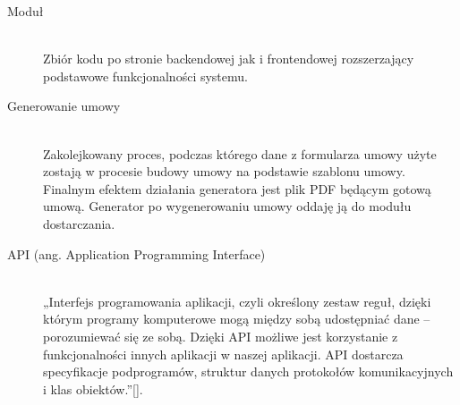 \begin{description}
    \item[Moduł] \hfill \\ Zbiór kodu po stronie backendowej jak i frontendowej rozszerzający podstawowe funkcjonalności systemu.

    \item[Generowanie umowy] \hfill \\ Zakolejkowany proces, podczas którego dane z formularza umowy użyte zostają w procesie budowy umowy na podstawie szablonu umowy. Finalnym efektem działania generatora jest plik PDF będącym gotową umową. Generator po wygenerowaniu umowy oddaję ją do modułu dostarczania. 

    \item[API (ang. Application Programming Interface)] \hfill \\ „Interfejs programowania aplikacji, czyli określony zestaw reguł, dzięki którym programy komputerowe mogą między sobą udostępniać dane – porozumiewać się ze sobą. Dzięki API możliwe jest korzystanie z funkcjonalności innych aplikacji w naszej aplikacji. API dostarcza specyfikacje podprogramów, struktur danych protokołów komunikacyjnych i klas obiektów.”[\cite{api}]. 
\end{description}
